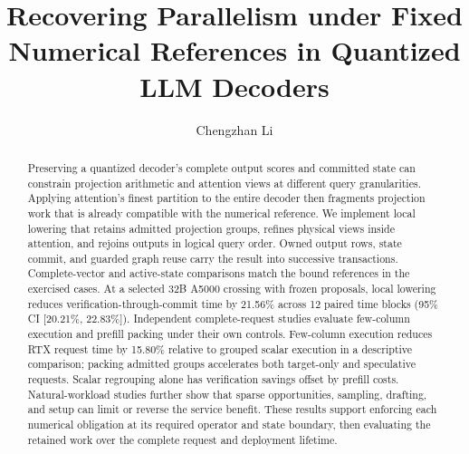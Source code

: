 \documentclass[acmsmall,screen,nonacm]{acmart}
\begin{document}
\raggedbottom
\title[Recovering Parallelism under Fixed Numerical References]{Recovering Parallelism under Fixed Numerical References in Quantized LLM Decoders}
\author{Chengzhan Li}
\renewcommand{\shortauthors}{C. Li}
\begin{abstract}
Preserving a quantized decoder's complete output scores and committed state can constrain projection arithmetic and attention views at different query granularities. Applying attention's finest partition to the entire decoder then fragments projection work that is already compatible with the numerical reference. We implement local lowering that retains admitted projection groups, refines physical views inside attention, and rejoins outputs in logical query order. Owned output rows, state commit, and guarded graph reuse carry the result into successive transactions. Complete-vector and active-state comparisons match the bound references in the exercised cases. At a selected 32B A5000 crossing with frozen proposals, local lowering reduces verification-through-commit time by 21.56\% across 12 paired time blocks (95\% CI [20.21\%, 22.83\%]). Independent complete-request studies evaluate few-column execution and prefill packing under their own controls. Few-column execution reduces RTX request time by 15.80\% relative to grouped scalar execution in a descriptive comparison; packing admitted groups accelerates both target-only and speculative requests. Scalar regrouping alone has verification savings offset by prefill costs. Natural-workload studies further show that sparse opportunities, sampling, drafting, and setup can limit or reverse the service benefit. These results support enforcing each numerical obligation at its required operator and state boundary, then evaluating the retained work over the complete request and deployment lifetime.
\end{abstract}
\maketitle
{}
\end{document}
